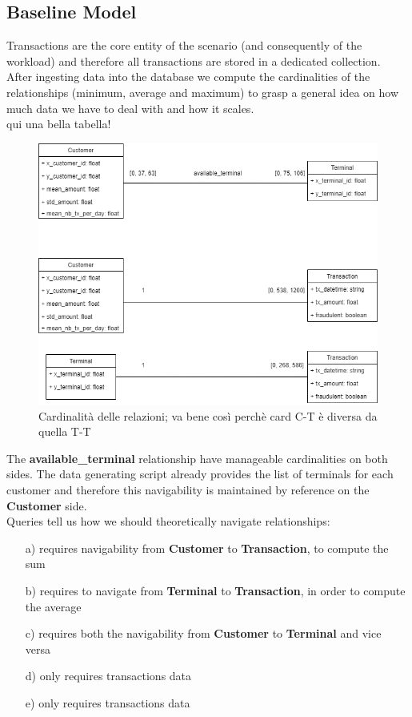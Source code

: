 \documentclass[runningheads]{llncs}
\begin{document}
\subsection{Baseline Model}
Transactions are the core entity of the scenario (and consequently of the workload) and therefore all transactions are stored in a dedicated collection.
\\
After ingesting data into the database we compute the cardinalities of the relationships (minimum, average and maximum) to grasp a general idea on how much data we have to deal with and how it scales.
\\
qui una bella tabella!
\\
\begin{figure}[!htb] 
        \centering \includegraphics[width=0.9\columnwidth]{images/MongoCardinality.png}
        \caption{\label{fig2}Cardinalità delle relazioni; va bene così perchè card C-T è diversa da quella T-T}
\end{figure}
The \textbf{available\_terminal} relationship have manageable cardinalities on both sides. The data generating script already provides the list of terminals for each customer and therefore this navigability is maintained by reference on the \textbf{Customer} side.
\\
Queries tell us how we should theoretically navigate relationships:
\begin{enumerate}
    \item[a)] requires navigability from \textbf{Customer} to \textbf{Transaction}, to compute the sum
    \item[b)] requires to navigate from \textbf{Terminal} to \textbf{Transaction}, in order to compute the average
    \item[c)] requires both the navigability from \textbf{Customer} to \textbf{Terminal} and vice versa
    \item[d)] only requires transactions data
    \item[e)] only requires transactions data
\end{enumerate}
\end{document}
